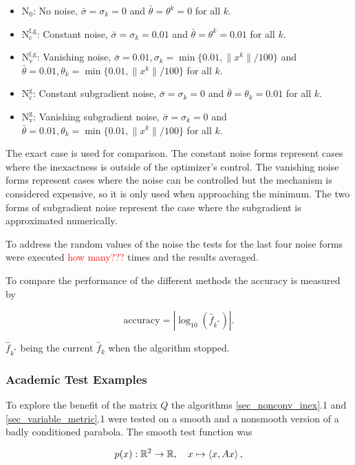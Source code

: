 \begin{itemize}[label={--}]
	\item \(\text{N}_0\): No noise, \(\bar{\sigma}=\sigma_k=0\) and \(\bar{\theta}=\theta^k=0\) for all \(k\).
	\item \(\text{N}_{\text{c}}^{\text{f,g}}\): Constant noise, \(\bar{\sigma}=\sigma_k=0.01\) and \(\bar{\theta}=\theta^k=0.01\) for all \(k\).
	\item \(\text{N}_{\text{v}}^{\text{f,g}}\): Vanishing noise, \(\bar{\sigma}=0.01, \sigma_k = \min\{0.01,\|x^k\|/100\}\) and \(\bar{\theta}=0.01, \theta_k=\min\{0.01,\|x^k\|/100\}\) for all \(k\).
	\item \(\text{N}_{\text{c}}^{\text{g}}\): Constant subgradient noise, \(\bar{\sigma}=\sigma_k=0\) and \(\bar{\theta}=\theta_k=0.01\) for all \(k\).
	\item \(\text{N}_{\text{v}}^{\text{g}}\): Vanishing subgradient noise, \(\bar{\sigma}=\sigma_k=0\) and \(\bar{\theta}=0.01, \theta_k=\min\{0.01,\|x^k\|/100\}\) for all \(k\).
\end{itemize}
The exact case is used for comparison. The constant noise forms represent cases where the inexactness is outside of the optimizer's control. The vanishing noise forms represent cases where the noise can be controlled  but the mechanism is considered expensive, so it is only used when approaching the minimum.
The two forms of subgradient noise represent the case where the subgradient is approximated numerically.

To address the random values of the noise the tests for the last four noise forms were executed \textcolor{red}{how many???} times and the results averaged.

To compare the performance of the different methods the accuracy is measured by

\[ \text{accuracy} = |\log_{10}(\hat{f}_{k^*})|. \]

\(\hat{f}_{k^*}\) being the current \(\hat{f}_k\) when the algorithm stopped.

\subsubsection{Academic Test Examples}

To explore the benefit of the matrix \(Q\) the algorithms \ref{sec_nonconv_inex}.1 and \ref{sec_variable_metric}.1 were tested on a smooth and a nonsmooth version of a badly conditioned parabola.
The smooth test function was 

\[p(x): \mathbb{R}^2 \to \mathbb{R}, \quad x \mapsto \left\langle x, Ax \right\rangle,\]

